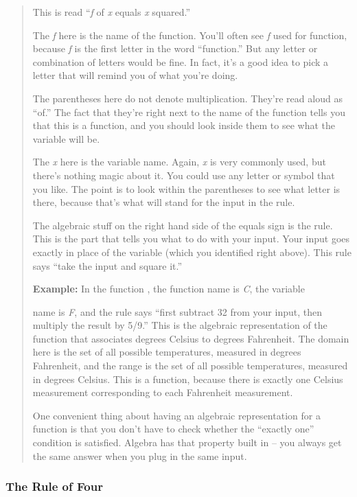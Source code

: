 \begin{quote}
This is read ``\emph{f} of \emph{x} equals \emph{x} squared.''

The \emph{f} here is the name of the function. You'll often see \emph{f}
used for function, because \emph{f} is the first letter in the word
``function.'' But any letter or combination of letters would be fine. In
fact, it's a good idea to pick a letter that will remind you of what
you're doing.

The parentheses here do not denote multiplication. They're read aloud as
``of.'' The fact that they're right next to the name of the function
tells you that this is a function, and you should look inside them to
see what the variable will be.

The \emph{x} here is the variable name. Again, \emph{x} is very commonly
used, but there's nothing magic about it. You could use any letter or
symbol that you like. The point is to look within the parentheses to see
what letter is there, because that's what will stand for the input in
the rule.

The algebraic stuff on the right hand side of the equals sign is the
rule. This is the part that tells you what to do with your input. Your
input goes exactly in place of the variable (which you identified right
above). This rule says ``take the input and square it.''

\textbf{Example:} In the function , the function name is \emph{C}, the
variable

name is \emph{F}, and the rule says ``first subtract 32 from your input,
then multiply the result by 5/9.'' This is the algebraic representation
of the function that associates degrees Celsius to degrees Fahrenheit.
The domain here is the set of all possible temperatures, measured in
degrees Fahrenheit, and the range is the set of all possible
temperatures, measured in degrees Celsius. This is a function, because
there is exactly one Celsius measurement corresponding to each
Fahrenheit measurement.

One convenient thing about having an algebraic representation for a
function is that you don't have to check whether the ``exactly one''
condition is satisfied. Algebra has that property built in -- you always
get the same answer when you plug in the same input.
\end{quote}

\subsubsection{The Rule of Four}\label{the-rule-of-four}


